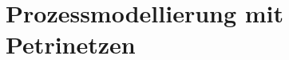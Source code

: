 \cleardoublepage
\chapter{Prozessmodellierung mit Petrinetzen}
\label{sec:Kap-5}


\clearpage

\clearpage

\clearpage

\clearpage

\clearpage

\clearpage

\clearpage

\clearpage

\clearpage

\clearpage


\clearpage

